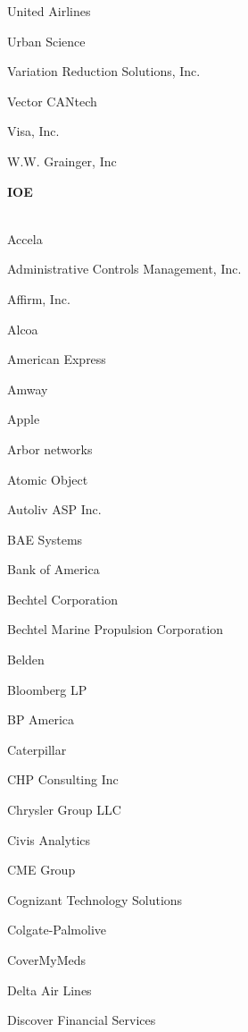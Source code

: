 \documentclass[twoside]{article}
\begin{document}
\begin{center}
\begin{multicols}{5}
\begin{FlushLeft}
\begin{compactitem}
\item United Airlines
\item Urban Science
\item Variation Reduction Solutions, Inc.
\item Vector CANtech
\item Visa, Inc.
\item W.W. Grainger, Inc
\end{compactitem}
        \end{FlushLeft}
        \vspace{1em}
        {\fontsize{14}{16}\selectfont \bf IOE}\\
        \vspace{-1em}
        ~\hrulefill~
        \vspace{-.9em}
        \begin{FlushLeft}
        \begin{compactitem}
        \item Accela
\item Administrative Controls Management, Inc.
\item Affirm, Inc.
\item Alcoa
\item American Express
\item Amway
\item Apple
\item Arbor networks
\item Atomic Object
\item Autoliv ASP Inc.
\item BAE Systems
\item Bank of America
\item Bechtel Corporation
\item Bechtel Marine Propulsion Corporation
\item Belden
\item Bloomberg LP
\item BP America
\item Caterpillar
\item CHP Consulting Inc
\item Chrysler Group LLC
\item Civis Analytics
\item CME Group
\item Cognizant Technology Solutions
\item Colgate-Palmolive
\item CoverMyMeds
\item Delta Air Lines
\item Discover Financial Services

\end{compactitem}
\end{FlushLeft}
\end{multicols}
\end{center}
\end{document}
